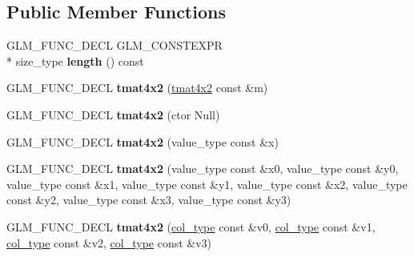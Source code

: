 \subsection*{Public Member Functions}
\begin{DoxyCompactItemize}
\item 
\hypertarget{structglm_1_1detail_1_1tmat4x2_a36f50e76c1c508ca17176aea229ca2e6}{G\-L\-M\-\_\-\-F\-U\-N\-C\-\_\-\-D\-E\-C\-L G\-L\-M\-\_\-\-C\-O\-N\-S\-T\-E\-X\-P\-R \\*
size\-\_\-type {\bfseries length} () const }\label{structglm_1_1detail_1_1tmat4x2_a36f50e76c1c508ca17176aea229ca2e6}

\item 
\hypertarget{structglm_1_1detail_1_1tmat4x2_a21673f91cd632a43d412702336f2b982}{G\-L\-M\-\_\-\-F\-U\-N\-C\-\_\-\-D\-E\-C\-L {\bfseries tmat4x2} (\hyperlink{structglm_1_1detail_1_1tmat4x2}{tmat4x2} const \&m)}\label{structglm_1_1detail_1_1tmat4x2_a21673f91cd632a43d412702336f2b982}

\item 
\hypertarget{structglm_1_1detail_1_1tmat4x2_a66c897d620eda8ceed552aecd16dde84}{G\-L\-M\-\_\-\-F\-U\-N\-C\-\_\-\-D\-E\-C\-L {\bfseries tmat4x2} (ctor Null)}\label{structglm_1_1detail_1_1tmat4x2_a66c897d620eda8ceed552aecd16dde84}

\item 
\hypertarget{structglm_1_1detail_1_1tmat4x2_afc3d841b8ed8a9071021990b418de881}{G\-L\-M\-\_\-\-F\-U\-N\-C\-\_\-\-D\-E\-C\-L {\bfseries tmat4x2} (value\-\_\-type const \&x)}\label{structglm_1_1detail_1_1tmat4x2_afc3d841b8ed8a9071021990b418de881}

\item 
\hypertarget{structglm_1_1detail_1_1tmat4x2_ae052381f88eadec6c0a28c42dba21871}{G\-L\-M\-\_\-\-F\-U\-N\-C\-\_\-\-D\-E\-C\-L {\bfseries tmat4x2} (value\-\_\-type const \&x0, value\-\_\-type const \&y0, value\-\_\-type const \&x1, value\-\_\-type const \&y1, value\-\_\-type const \&x2, value\-\_\-type const \&y2, value\-\_\-type const \&x3, value\-\_\-type const \&y3)}\label{structglm_1_1detail_1_1tmat4x2_ae052381f88eadec6c0a28c42dba21871}

\item 
\hypertarget{structglm_1_1detail_1_1tmat4x2_a31d767bc971c9378a1deff8f62dd6575}{G\-L\-M\-\_\-\-F\-U\-N\-C\-\_\-\-D\-E\-C\-L {\bfseries tmat4x2} (\hyperlink{structglm_1_1detail_1_1tvec2}{col\-\_\-type} const \&v0, \hyperlink{structglm_1_1detail_1_1tvec2}{col\-\_\-type} const \&v1, \hyperlink{structglm_1_1detail_1_1tvec2}{col\-\_\-type} const \&v2, \hyperlink{structglm_1_1detail_1_1tvec2}{col\-\_\-type} const \&v3)}\label{structglm_1_1detail_1_1tmat4x2_a31d767bc971c9378a1deff8f62dd6575}


\end{DoxyCompactItemize}
